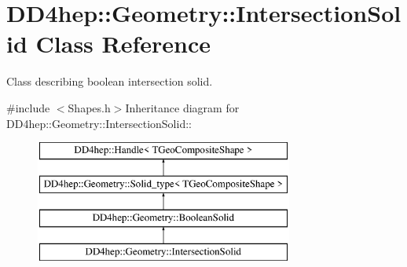 \hypertarget{class_d_d4hep_1_1_geometry_1_1_intersection_solid}{
\section{DD4hep::Geometry::IntersectionSolid Class Reference}
\label{class_d_d4hep_1_1_geometry_1_1_intersection_solid}
}


Class describing boolean intersection solid.  


{\ttfamily \#include $<$Shapes.h$>$}Inheritance diagram for DD4hep::Geometry::IntersectionSolid::\begin{figure}[H]
\begin{center}
\leavevmode
\includegraphics[height=4cm]{class_d_d4hep_1_1_geometry_1_1_intersection_solid}
\end{center}
\end{figure}
